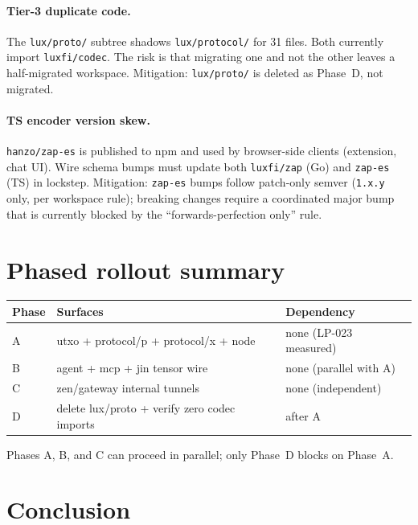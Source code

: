 \paragraph{Tier-3 duplicate code.}
The \texttt{lux/proto/} subtree shadows \texttt{lux/protocol/} for 31
files. Both currently import \texttt{luxfi/codec}. The risk is that
migrating one and not the other leaves a half-migrated workspace.
Mitigation: \texttt{lux/proto/} is deleted as Phase~D, not migrated.

\paragraph{TS encoder version skew.}
\texttt{hanzo/zap-es} is published to npm and used by browser-side
clients (extension, chat UI). Wire schema bumps must update both
\texttt{luxfi/zap} (Go) and \texttt{zap-es} (TS) in lockstep.
Mitigation: \texttt{zap-es} bumps follow patch-only semver
(\texttt{1.x.y} only, per workspace rule); breaking changes require a
coordinated major bump that is currently blocked by the
``forwards-perfection only'' rule.

\section{Phased rollout summary}
\label{sec:rollout}

\begin{center}
\begin{tabular}{lll}
\toprule
\textbf{Phase} & \textbf{Surfaces} & \textbf{Dependency} \\
\midrule
A & utxo + protocol/p + protocol/x + node    & none (LP-023 measured) \\
B & agent + mcp + jin tensor wire             & none (parallel with A) \\
C & zen/gateway internal tunnels              & none (independent) \\
D & delete lux/proto + verify zero codec imports & after A \\
\bottomrule
\end{tabular}
\end{center}

Phases A, B, and C can proceed in parallel; only Phase~D blocks on
Phase~A.

\section{Conclusion}
\label{sec:conclusion}

